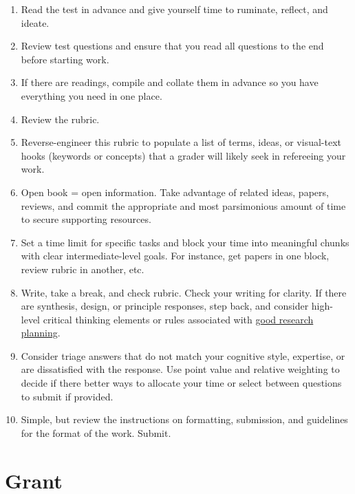 \documentclass[
]{book}
\providecommand{\tightlist}{%
  \setlength{\itemsep}{0pt}\setlength{\parskip}{0pt}}
\begin{document}
\begin{enumerate}
\def\labelenumi{\arabic{enumi}.}
\tightlist
\item
  Read the test in advance and give yourself time to ruminate, reflect, and ideate.\\
\item
  Review test questions and ensure that you read all questions to the end before starting work.\\
\item
  If there are readings, compile and collate them in advance so you have everything you need in one place.\\
\item
  Review the rubric.\\
\item
  Reverse-engineer this rubric to populate a list of terms, ideas, or visual-text hooks (keywords or concepts) that a grader will likely seek in refereeing your work.
\item
  Open book = open information. Take advantage of related ideas, papers, reviews, and commit the appropriate and most parsimonious amount of time to secure supporting resources.\\
\item
  Set a time limit for specific tasks and block your time into meaningful chunks with clear intermediate-level goals. For instance, get papers in one block, review rubric in another, etc.\\
\item
  Write, take a break, and check rubric. Check your writing for clarity. If there are synthesis, design, or principle responses, step back, and consider high-level critical thinking elements or rules associated with \href{https://journals.plos.org/ploscompbiol/article?id=10.1371/journal.pcbi.1010139}{good research planning}.\\
\item
  Consider triage answers that do not match your cognitive style, expertise, or are dissatisfied with the response. Use point value and relative weighting to decide if there better ways to allocate your time or select between questions to submit if provided.\\
\item
  Simple, but review the instructions on formatting, submission, and guidelines for the format of the work. Submit.
\end{enumerate}

\hypertarget{grant}{%
\chapter{Grant}\label{grant}}
\end{document}
